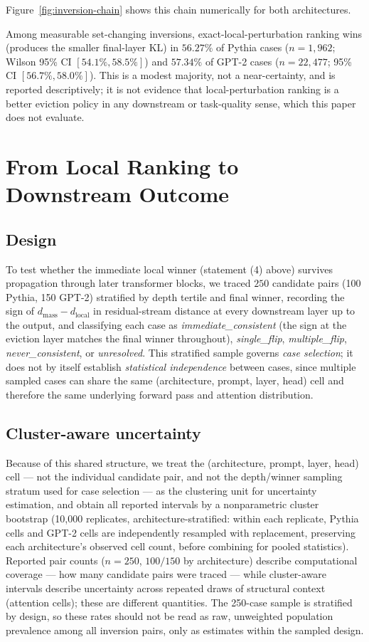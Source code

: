 \documentclass[11pt]{article}
\begin{document}
Figure~\ref{fig:inversion-chain} shows this chain numerically for both
architectures.

Among measurable set-changing inversions, exact-local-perturbation ranking
wins (produces the smaller final-layer KL) in $56.27\%$ of Pythia cases
($n=1{,}962$; Wilson 95\% CI $[54.1\%,58.5\%]$) and $57.34\%$ of GPT-2 cases
($n=22{,}477$; 95\% CI $[56.7\%,58.0\%]$). This is a modest majority, not a
near-certainty, and is reported descriptively; it is not evidence that
local-perturbation ranking is a better eviction policy in any downstream or
task-quality sense, which this paper does not evaluate.

\section{From Local Ranking to Downstream Outcome}
\label{sec:downstream}

\subsection{Design}

To test whether the immediate local winner (statement (4) above) survives
propagation through later transformer blocks, we traced $250$ candidate
pairs (100 Pythia, 150 GPT-2) stratified by depth tertile and final winner,
recording the sign of $d_{\text{mass}} - d_{\text{local}}$ in residual-stream
distance at every downstream layer up to the output, and classifying each
case as \emph{immediate\_consistent} (the sign at the eviction layer matches
the final winner throughout), \emph{single\_flip}, \emph{multiple\_flip},
\emph{never\_consistent}, or \emph{unresolved}. This stratified sample
governs \emph{case selection}; it does not by itself establish
\emph{statistical independence} between cases, since multiple sampled cases
can share the same (architecture, prompt, layer, head) cell and therefore
the same underlying forward pass and attention distribution.

\subsection{Cluster-aware uncertainty}

Because of this shared structure, we treat the
(architecture, prompt, layer, head) cell --- not the individual candidate
pair, and not the depth/winner sampling stratum used for case selection ---
as the clustering unit for uncertainty estimation, and obtain all reported
intervals by a nonparametric cluster bootstrap (10{,}000 replicates,
architecture-stratified: within each replicate, Pythia cells and GPT-2 cells
are independently resampled with replacement, preserving each
architecture's observed cell count, before combining for pooled statistics).
Reported pair counts ($n=250$, $100/150$ by architecture) describe
computational coverage --- how many candidate pairs were traced --- while
cluster-aware intervals describe uncertainty across repeated draws of
structural context (attention cells); these are different quantities. The
250-case sample is stratified by design, so these rates should not be read
as raw, unweighted population prevalence among all inversion pairs, only as
estimates within the sampled design.
\end{document}
